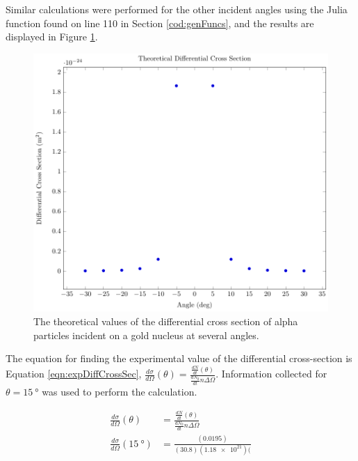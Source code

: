 \documentclass[a4paper]{article}
\begin{document}
Similar calculations were performed for the other incident angles using the
Julia function found on line 110 in Section \ref{cod:genFuncs}, and the
results are displayed in Figure \ref{gph:theoCrossSecAu}.

\begin{figure}[H]
  \begin{center}
    \includegraphics[scale=0.8]{Plots/TheoreticalCrossSectionalArea/theoCrossSec.pdf}
  \end{center}
  \caption{The theoretical values of the differential cross section of
    alpha particles incident on a gold nucleus at several angles.}
  \label{gph:theoCrossSecAu}
\end{figure}
  
\qq The equation for finding the experimental value of the differential
cross-section is Equation \ref{eqn:expDiffCrossSec}, \( \frac{d\sigma}{d\Omega}
(\theta) = \frac{\frac{dN}{dt} (\theta)}{\frac{dN_0}{dt} n \Delta \Omega}
\). Information collected for \( \theta = \SI{15}{\degree} \) was used to
perform the calculation.

\begin{align*}
  \frac{d\sigma}{d\Omega} (\theta) &= \frac{\frac{dN}{dt}
                                     (\theta)}{\frac{dN_0}{dt} n \Delta \Omega}
  \\
  \frac{d\sigma}{d\Omega} (\SI{15}{\degree}) 
   &= \frac{(\num{0.0195})}{(30.8) (\num{1.18e21}) (}
\end{align*}
\end{document}
